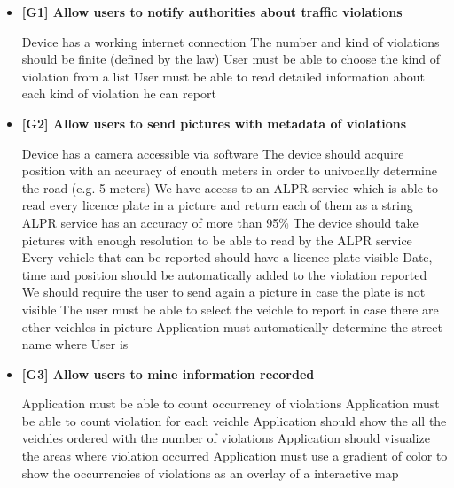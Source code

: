 \begin{itemize}
\item \textbf{[G1] Allow users to notify authorities about traffic violations} %
\begin{itemize}
   Device has a working internet connection
   The number and kind of violations should be finite (defined by the law)
   User must be able to choose the kind of violation from a list
   User must be able to read detailed information about each kind of violation he can report
  \end{itemize}

\item \textbf{[G2] Allow users to send pictures with metadata of violations } %
\begin{itemize}
   Device has a camera accessible via software
   The device should acquire position with an accuracy of enouth meters in order to univocally determine the road (e.g. 5 meters)
   We have access to an ALPR service which is able to read every licence plate in a picture and return each of them as a string
   ALPR service has an accuracy of more than 95\%
   The device should take pictures with enough resolution to be able to read by the ALPR service
   Every vehicle that can be reported should have a licence plate visible
   Date, time and position should be automatically added to the violation reported
   We should require the user to send again a picture in case the plate is not visible
   The user must be able to select the veichle to report in case there are other veichles in picture
   Application must automatically determine the street name where User is
\end{itemize}

\item \textbf{[G3] Allow users to mine information recorded}  %
\begin{itemize}
   Application must be able to count occurrency of violations
   Application must be able to count violation for each veichle
   Application should show the all the veichles ordered with the number of violations
   Application should visualize the areas where violation occurred
   Application must use a gradient of color to show the occurrencies of violations as an overlay of a interactive map
\end{itemize}


\end{itemize}

